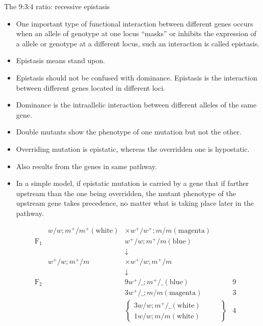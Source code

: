 \documentclass[11pt,dvipsnames,ignorenonframetext,aspectratio=169]{beamer}
\providecommand{\tightlist}{%
  \setlength{\itemsep}{0pt}\setlength{\parskip}{0pt}}
\begin{document}
\begin{frame}{The 9:3:4 ratio: recessive epistasis}
\protect\hypertarget{the-934-ratio-recessive-epistasis}{}

\begin{itemize}
\tightlist
\item
  One important type of functional interaction between different genes
  occurs when an allele of genotype at one locus ``masks'' or inhibits
  the expression of a allele or genotype at a different locus, such an
  interaction is called epistasis.
\item
  Epistasis means stand upon.
\item
  Epistasis should not be confused with dominance. Epistasis is the
  interaction between different genes located in different loci.
\item
  Dominance is the intraallelic interaction between different alleles of
  the same gene.
\item
  Double mutants show the phenotype of one mutation but not the other.
\item
  Overriding mutation is epistatic, whereas the overridden one is
  hypostatic.
\item
  Also results from the genes in same pathway.
\item
  In a simple model, if epistatic mutation is carried by a gene that if
  farther upstream than the one being overridden, the mutant phenotype
  of the upstream gene takes precedence, no matter what is taking place
  later in the pathway.
\end{itemize}

\end{frame}

\begin{frame}{}
\protect\hypertarget{section-18}{}

\[
\begin{aligned}
& & w/w; m^+/m^+ (\text{white}) & \times w^+/w^+; m/m (\text{magenta}) &\\
& \mathrm{F_1} & & w^+/w; m^+/m (\text{blue}) & \\
& & & \downarrow & \\
& & w^+/w; m^+/m &\times w^+/w; m^+/m & \\
& & & \downarrow & \\
& \mathrm{F_2} & & 9w^+/\_; m^+/\_ (\text{blue}) \hspace{1cm} & 9 \\
& & & 3 w^+/\_; m/m (\text{magenta}) \hspace{1cm} & 3 \\
& & & \left\{
\begin{array}{ll}
3 w/w; m^+/\_ (\text{white}) \hspace{1cm} \\
1 w/w; m/m (\text{white})
\end{array}
\right\} & 4
\end{aligned}
\]

\end{frame}
\end{document}
